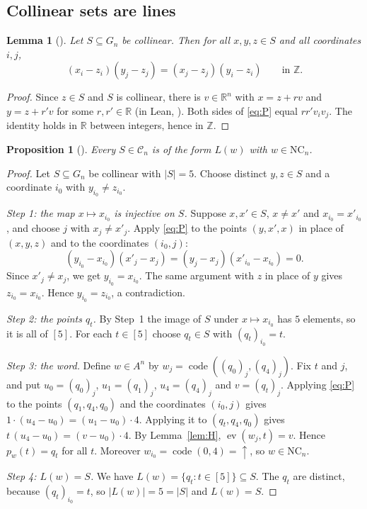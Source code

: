 \documentclass[11pt]{amsart}
\theoremstyle{plain}
\newtheorem{lemma}[theorem]{Lemma}
\newtheorem{proposition}[theorem]{Proposition}
\theoremstyle{definition}
\newcommand{\Z}{\mathbb{Z}}
\newcommand{\R}{\mathbb{R}}
\newcommand{\up}{{\uparrow}}
\newcommand{\ev}{\operatorname{ev}}
\newcommand{\code}{\operatorname{code}}
\newcommand{\NC}{\mathrm{NC}}
\begin{document}
\subsection{Collinear sets are lines}

\begin{lemma}[]\label{lem:P}
Let $S\subseteq G_n$ be collinear. Then for all $x,y,z\in S$ and all coordinates $i,j$,
\begin{equation}\label{eq:P}
  (x_i-z_i)(y_j-z_j)=(x_j-z_j)(y_i-z_i)\qquad\text{in }\Z .
\end{equation}
\end{lemma}

\begin{proof}
Since $z\in S$ and $S$ is collinear, there is $v\in\R^n$ with $x=z+rv$ and $y=z+r'v$ for some $r,r'\in\R$ (in Lean, ). Both sides of \eqref{eq:P} equal $rr'v_iv_j$. The identity holds in $\R$ between integers, hence in $\Z$.
\end{proof}

\begin{proposition}[]\label{prop:exists}
Every $S\in\mathcal C_n$ is of the form $L(w)$ with $w\in\NC_n$.
\end{proposition}

\begin{proof}
Let $S\subseteq G_n$ be collinear with $|S|=5$. Choose distinct $y,z\in S$ and a coordinate $i_0$ with $y_{i_0}\ne z_{i_0}$.

\emph{Step 1: the map $x\mapsto x_{i_0}$ is injective on $S$.} Suppose $x,x'\in S$, $x\ne x'$ and $x_{i_0}=x'_{i_0}$, and choose $j$ with $x_j\ne x'_j$. Apply \eqref{eq:P} to the points $(y,x',x)$ in place of $(x,y,z)$ and to the coordinates $(i_0,j)$:
\[
  (y_{i_0}-x_{i_0})(x'_j-x_j)=(y_j-x_j)(x'_{i_0}-x_{i_0})=0 .
\]
Since $x'_j\ne x_j$, we get $y_{i_0}=x_{i_0}$. The same argument with $z$ in place of $y$ gives $z_{i_0}=x_{i_0}$. Hence $y_{i_0}=z_{i_0}$, a contradiction.

\emph{Step 2: the points $q_t$.} By Step~1 the image of $S$ under $x\mapsto x_{i_0}$ has $5$ elements, so it is all of $[5]$. For each $t\in[5]$ choose $q_t\in S$ with $(q_t)_{i_0}=t$.

\emph{Step 3: the word.} Define $w\in A^n$ by $w_j=\code((q_0)_j,(q_4)_j)$. Fix $t$ and $j$, and put $u_0=(q_0)_j$, $u_1=(q_1)_j$, $u_4=(q_4)_j$ and $v=(q_t)_j$.
Applying \eqref{eq:P} to the points $(q_1,q_4,q_0)$ and the coordinates $(i_0,j)$ gives $1\cdot(u_4-u_0)=(u_1-u_0)\cdot4$. Applying it to $(q_t,q_4,q_0)$ gives $t\,(u_4-u_0)=(v-u_0)\cdot4$.
By Lemma~\ref{lem:H}, $\ev(w_j,t)=v$. Hence $p_w(t)=q_t$ for all $t$.
Moreover $w_{i_0}=\code(0,4)=\up$, so $w\in\NC_n$.

\emph{Step 4: $L(w)=S$.} We have $L(w)=\{q_t: t\in[5]\}\subseteq S$. The $q_t$ are distinct, because $(q_t)_{i_0}=t$, so $|L(w)|=5=|S|$ and $L(w)=S$.
\end{proof}
\end{document}
